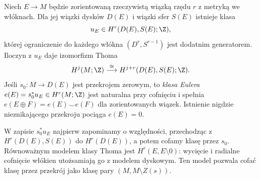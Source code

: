 \begin{twierdzenie}
\label{thm:euler-thom-16}
Niech $E\to M$ będzie
zorientowaną rzeczywistą
wiązką rzędu $r$ z metryką
we włóknach. Dla jej
wiązki dysków $D(E)$
i wiązki sfer $S(E)$
istnieje klasa
\[
 u_E\in H^r(D(E),S(E);\Z),
\]
której ograniczenie do
każdego włókna
$(D^r,S^{r-1})$ jest
dodatnim generatorem.
Iloczyn z $u_E$ daje
izomorfizm Thoma
\[
 H^j(M;\Z)\stackrel{\cong}{\longrightarrow}
 H^{j+r}(D(E),S(E);\Z).
\]
Jeśli $s_0:M\to D(E)$
jest przekrojem zerowym,
to \emph{klasa Eulera}
$e(E)=s_0^*u_E\in H^r(M;\Z)$
jest naturalna przy
cofnięciu i spełnia
$e(E\oplus F)=e(E)\smile e(F)$
dla zorientowanych wiązek.
Istnienie nigdzie nieznikającego
przekroju pociąga $e(E)=0$.
\end{twierdzenie}

W zapisie $s_0^*u_E$ najpierw zapominamy o względności,
przechodząc z $H^r(D(E),S(E))$ do $H^r(D(E))$,
a potem cofamy klasę przez $s_0$. Równoważnym modelem
klasy Thoma jest $H^r(E,E\setminus0)$: wycięcie
i radialne cofnięcie włókien utożsamiają go z modelem
dyskowym. Ten model pozwala cofać klasę przez przekrój
jako klasę pary $(M,M\setminus Z(s))$.

